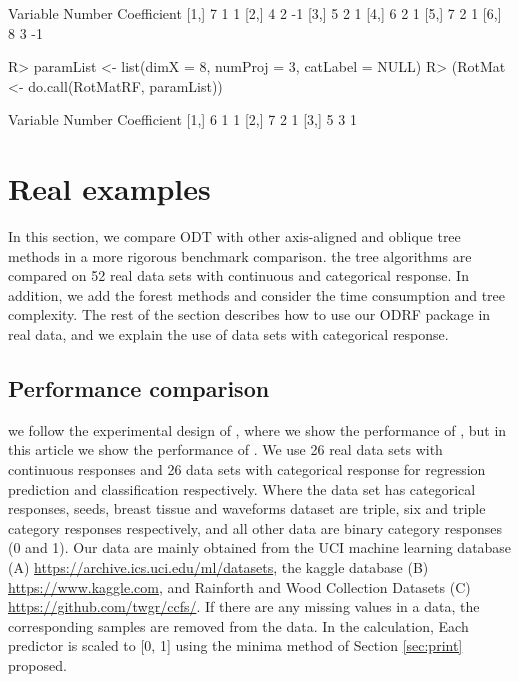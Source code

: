 \documentclass[nojss]{jss}
\numberwithin{equation}{section}
\begin{document}
\begin{Schunk}
\begin{Sinput}
\end{Sinput}
\begin{Soutput}
     Variable Number Coefficient
[1,]        7      1           1
[2,]        4      2          -1
[3,]        5      2           1
[4,]        6      2           1
[5,]        7      2           1
[6,]        8      3          -1
\end{Soutput}
\begin{Sinput}
R> paramList <- list(dimX = 8, numProj = 3, catLabel = NULL)
R> (RotMat <- do.call(RotMatRF, paramList))
\end{Sinput}
\begin{Soutput}
     Variable Number Coefficient
[1,]        6      1           1
[2,]        7      2           1
[3,]        5      3           1
\end{Soutput}
\end{Schunk}
\section{Real examples} \label{sec:examples}
In this section, we compare ODT with other axis-aligned and oblique tree methods in a more rigorous benchmark comparison. the tree algorithms are compared on 52 real data sets with continuous and categorical response. In addition, we add the forest methods and consider the time consumption and tree complexity. The rest of the section describes how to use our ODRF package in real data, and we explain the use of data sets with categorical response.

\subsection{Performance comparison}
we follow the experimental design of \cite{zhan2022consistency}, where we show the performance of  , but in this article we show the performance of . We use 26 real data sets with continuous responses  and 26 data sets with categorical response for regression prediction and classification respectively. Where the data set has categorical responses, seeds, breast tissue and waveforms dataset are triple, six and triple category responses respectively, and all other data are binary category responses (0 and 1). Our data are mainly obtained from the UCI machine learning database (A) \url{https://archive.ics.uci.edu/ml/datasets}, the kaggle database (B) \url{https://www.kaggle.com}, and Rainforth and Wood \cite{rainforth2015canonical} Collection Datasets (C) \url{https://github.com/twgr/ccfs/}.
If there are any missing values in a data, the corresponding samples are removed from the data. In the calculation, Each predictor is scaled to [0, 1] using the minima method of Section \ref{sec:print} proposed.
\end{document}
